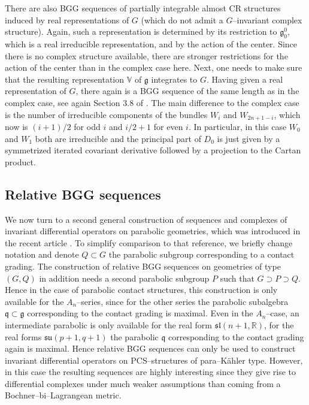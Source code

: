 \documentclass[12pt,a4paper]{amsart}
\def\frak{\mathfrak}
\def\Bbb{\mathbb}
\numberwithin{theorem}{section}
\theoremstyle{definition}
\theoremstyle{remark}
\begin{document}
There are also BGG sequences of partially integrable almost CR
structures induced by real representations of $G$ (which do not admit
a $G$--invariant complex structure). Again, such a representation is
determined by its restriction to $\frak g_0^0$, which is a real
irreducible representation, and by the action of the center. Since
there is no complex structure available, there are stronger
restrictions for the action of the center than in the complex case
here. Next, one needs to make sure that the resulting representation
$\Bbb V$ of $\frak g$ integrates to $G$. Having given a real
representation of $G$, there again is a BGG sequence of the same
length as in the complex case, see again Section 3.8 of
\cite{subcomplexes}. The main difference to the complex case is the
number of irreducible components of the bundles $W_i$ and
$W_{2n+1-i}$, which now is $(i+1)/2$ for odd $i$ and $i/2+1$ for even
$i$. In particular, in this case $W_0$ and $W_1$ both are irreducible
and the principal part of $D_0$ is just given by a symmetrized iterated
covariant derivative followed by a projection to the Cartan product. 

\subsection{Relative BGG sequences}\label{3.5}
We now turn to a second general construction of sequences and
complexes of invariant differential operators on parabolic geometries,
which was introduced in the recent article \cite{Rel-BGG2}. To
simplify comparison to that reference, we briefly change notation and
denote $Q\subset G$ the parabolic subgroup corresponding to a contact
grading. The construction of relative BGG sequences on geometries of
type $(G,Q)$ in addition needs a second parabolic subgroup $P$ such
that $G\supset P\supset Q$. Hence in the case of parabolic contact
structures, this construction is only available for the $A_n$--series,
since for the other series the parabolic subalgebra $\frak
q\subset\frak g$ corresponding to the contact grading is maximal. Even
in the $A_n$--case, an intermediate parabolic is only available for
the real form $\frak{sl}(n+1,\Bbb R)$, for the real forms
$\frak{su}(p+1,q+1)$ the parabolic $\frak q$ corresponding to the
contact grading again is maximal. Hence relative BGG sequences can
only be used to construct invariant differential operators on
PCS--structures of para--K\"ahler type. However, in this case the
resulting sequences are highly interesting since they give rise to
differential complexes under much weaker assumptions than coming from
a Bochner--bi--Lagrangean metric.
\end{document}
